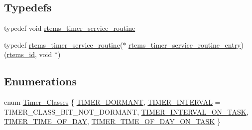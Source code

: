 \subsection*{Typedefs}
\begin{DoxyCompactItemize}
\item 
typedef void \mbox{\hyperlink{group__ClassicTimer_gaa5c0d66d51a2f94638228014deb0ee0f}{rtems\+\_\+timer\+\_\+service\+\_\+routine}}
\item 
typedef \mbox{\hyperlink{group__ClassicTimer_gaa5c0d66d51a2f94638228014deb0ee0f}{rtems\+\_\+timer\+\_\+service\+\_\+routine}}($\ast$ \mbox{\hyperlink{group__ClassicTimer_gab7851346dd520066ddc58a25de671f51}{rtems\+\_\+timer\+\_\+service\+\_\+routine\+\_\+entry}}) (\mbox{\hyperlink{group__ClassicTasks_gab20892b814dced7dd4e5b9bf42becd57}{rtems\+\_\+id}}, void $\ast$)
\end{DoxyCompactItemize}
\subsection*{Enumerations}
\begin{DoxyCompactItemize}
\item 
enum \mbox{\hyperlink{group__ClassicTimer_gaca88ac1e833f63ec72d38e07677f2f27}{Timer\+\_\+\+Classes}} \{ \newline
\mbox{\hyperlink{group__ClassicTimer_ggaca88ac1e833f63ec72d38e07677f2f27af48093624c08f47ea960224a5d18cc39}{T\+I\+M\+E\+R\+\_\+\+D\+O\+R\+M\+A\+NT}}, 
\mbox{\hyperlink{group__ClassicTimer_ggaca88ac1e833f63ec72d38e07677f2f27a9d15e28429ade0cef1a25ce75af95197}{T\+I\+M\+E\+R\+\_\+\+I\+N\+T\+E\+R\+V\+AL}} = T\+I\+M\+E\+R\+\_\+\+C\+L\+A\+S\+S\+\_\+\+B\+I\+T\+\_\+\+N\+O\+T\+\_\+\+D\+O\+R\+M\+A\+NT, 
\mbox{\hyperlink{group__ClassicTimer_ggaca88ac1e833f63ec72d38e07677f2f27af086866182685bd194e54f0df5b458b3}{T\+I\+M\+E\+R\+\_\+\+I\+N\+T\+E\+R\+V\+A\+L\+\_\+\+O\+N\+\_\+\+T\+A\+SK}}, 
\mbox{\hyperlink{group__ClassicTimer_ggaca88ac1e833f63ec72d38e07677f2f27a66ea67e06d3af7bcb11213499c86d0fe}{T\+I\+M\+E\+R\+\_\+\+T\+I\+M\+E\+\_\+\+O\+F\+\_\+\+D\+AY}}, 
\newline
\mbox{\hyperlink{group__ClassicTimer_ggaca88ac1e833f63ec72d38e07677f2f27a6cbfcb761548cc060f4e46daff1e2d29}{T\+I\+M\+E\+R\+\_\+\+T\+I\+M\+E\+\_\+\+O\+F\+\_\+\+D\+A\+Y\+\_\+\+O\+N\+\_\+\+T\+A\+SK}}
 \}
\end{DoxyCompactItemize}
